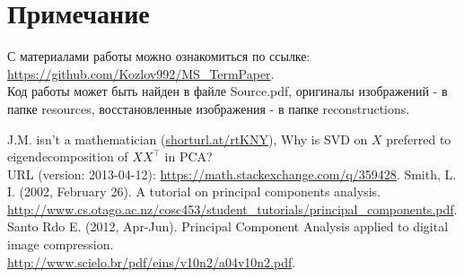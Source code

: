 \documentclass[a4paper]{article}
\begin{document}
\section*{Примечание}
С материалами работы можно ознакомиться по ссылке: \url{https://github.com/Kozlov992/MS_TermPaper}.\\ Код работы может быть найден в файле Source.pdf, оригиналы изображений - в папке resources, восстановленные изображения - в папке reconstructions.
\begin{thebibliography}{9}
J.M. isn't a mathematician (\url{shorturl.at/rtKNY}), Why is SVD on $X$ preferred to eigendecomposition of $XX^\top$ in PCA?\\URL (version: 2013-04-12): \url{https://math.stackexchange.com/q/359428}.
Smith, L. I. (2002, February 26). A tutorial on principal components analysis.\\
\url{http://www.cs.otago.ac.nz/cosc453/student_tutorials/principal_components.pdf}.
Santo Rdo E. (2012,  Apr-Jun). Principal Component Analysis applied to digital image compression.\\
\url{http://www.scielo.br/pdf/eins/v10n2/a04v10n2.pdf}.
\end{thebibliography}
\end{document}
